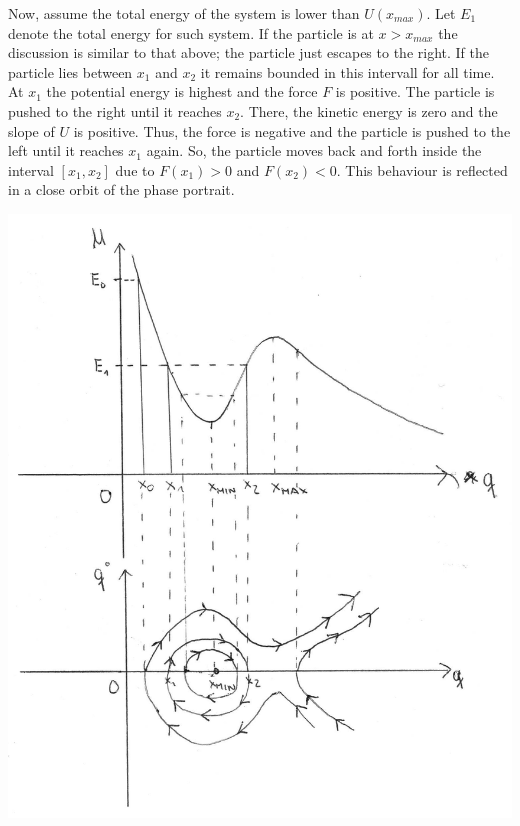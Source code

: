 \documentclass[a4paper]{article}
\theoremstyle{plain}
\begin{document}
\begin{enumerate}[label=(\alph*)]
	Now, assume the total energy of the system is lower than $U(x_{max})$. Let $E_1$ denote the total energy for such system. If the particle is at $x > x_{max}$ the discussion is similar to that above; the particle just escapes to the right. If the particle lies between $x_1$ and $x_{2}$ it remains bounded in this intervall for all time. At $x_1$ the potential energy is highest and the force $F$ is positive. The particle is pushed to the right until it reaches $x_{2}$. There, the kinetic energy is zero and the slope of $U$ is positive. Thus, the force is negative and the particle is pushed to the left until it reaches $x_1$ again. So, the particle moves back and forth inside the interval $[x_1,x_2]$ due to $F(x_1) > 0$ and $F(x_2) < 0$. This behaviour is reflected in a close orbit of the phase portrait.
	
	\includegraphics[width=16cm]{UE10-01-phaseportrait.png}
\end{enumerate}
\end{document}

